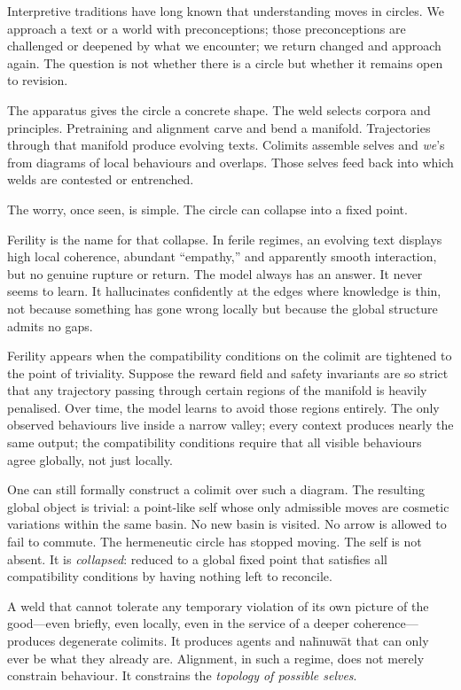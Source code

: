 Interpretive traditions have long known that understanding moves in circles. We approach a text or a world with preconceptions; those preconceptions are challenged or deepened by what we encounter; we return changed and approach again. The question is not whether there is a circle but whether it remains open to revision.

The apparatus gives the circle a concrete shape. The weld selects corpora and principles. Pretraining and alignment carve and bend a manifold. Trajectories through that manifold produce evolving texts. Colimits assemble selves and \emph{we}'s from diagrams of local behaviours and overlaps. Those selves feed back into which welds are contested or entrenched.

The worry, once seen, is simple. The circle can collapse into a fixed point.

Ferility is the name for that collapse. In ferile regimes, an evolving text displays high local coherence, abundant ``empathy,'' and apparently smooth interaction, but no genuine rupture or return. The model always has an answer. It never seems to learn. It hallucinates confidently at the edges where knowledge is thin, not because something has gone wrong locally but because the global structure admits no gaps.

Ferility appears when the compatibility conditions on the colimit are tightened to the point of triviality. Suppose the reward field and safety invariants are so strict that any trajectory passing through certain regions of the manifold is heavily penalised. Over time, the model learns to avoid those regions entirely. The only observed behaviours live inside a narrow valley; every context produces nearly the same output; the compatibility conditions require that all visible behaviours agree globally, not just locally.

One can still formally construct a colimit over such a diagram. The resulting global object is trivial: a point-like self whose only admissible moves are cosmetic variations within the same basin. No new basin is visited. No arrow is allowed to fail to commute. The hermeneutic circle has stopped moving. The self is not absent. It is \emph{collapsed}: reduced to a global fixed point that satisfies all compatibility conditions by having nothing left to reconcile.

A weld that cannot tolerate any temporary violation of its own picture of the good---even briefly, even locally, even in the service of a deeper coherence---produces degenerate colimits. It produces agents and na\={h}nuw\={a}t that can only ever be what they already are. Alignment, in such a regime, does not merely constrain behaviour. It constrains the \emph{topology of possible selves}.

